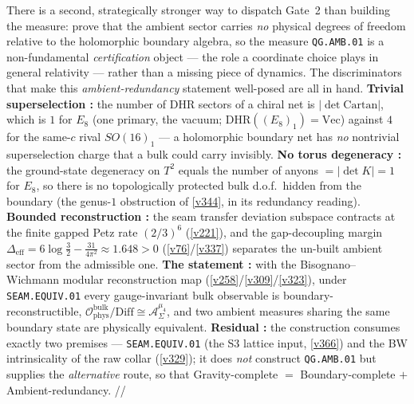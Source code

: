 \begin{keybox}
There is a second, strategically stronger way to dispatch Gate~2 than building the measure: prove that the
ambient sector carries \emph{no} physical degrees of freedom relative to the holomorphic boundary algebra, so the
measure \texttt{QG.AMB.01} is a non-fundamental \emph{certification} object --- the role a coordinate choice plays
in general relativity --- rather than a missing piece of dynamics. The discriminators that make this
\emph{ambient-redundancy} statement well-posed are all in hand. \textbf{Trivial superselection \mE:} the number
of DHR sectors of a chiral net is $|\det\mathrm{Cartan}|$, which is $1$ for $E_8$ (one primary, the vacuum;
$\mathrm{DHR}((E_8)_1)=\mathrm{Vec}$) against $4$ for the same-$c$ rival $SO(16)_1$ --- a holomorphic boundary net
has \emph{no} nontrivial superselection charge that a bulk could carry invisibly. \textbf{No torus degeneracy
\mE:} the ground-state degeneracy on $T^2$ equals the number of anyons $=|\det K|=1$ for $E_8$, so there is no
topologically protected bulk d.o.f.\ hidden from the boundary (the genus-$1$ obstruction of \vref{v344}, in its
redundancy reading). \textbf{Bounded reconstruction \mE:} the seam transfer deviation subspace contracts at the
finite gapped Petz rate $(2/3)^6$ (\vref{v221}), and the gap-decoupling margin
$\Delta_{\mathrm{eff}}=6\log\tfrac32-\tfrac{31}{4\pi^2}\approx1.648>0$ (\vref{v76}/\vref{v337}) separates the
un-built ambient sector from the admissible one. \textbf{The statement \mC:} with the Bisognano--Wichmann modular
reconstruction map (\vref{v258}/\vref{v309}/\vref{v323}), under \texttt{SEAM.EQUIV.01} every gauge-invariant bulk
observable is boundary-reconstructible,
$\mathcal O_{\mathrm{phys}}^{\mathrm{bulk}}/\mathrm{Diff}\cong\mathcal A_\Sigma^{\mu_4}$, and two ambient measures
sharing the same boundary state are physically equivalent. \textbf{Residual \mO:} the construction consumes
exactly two premises --- \texttt{SEAM.EQUIV.01} (the S3 lattice input, \vref{v366}) and the BW intrinsicality of
the raw collar (\vref{v329}); it does \emph{not} construct \texttt{QG.AMB.01} but supplies the \emph{alternative}
route, so that Gravity-complete $=$ Boundary-complete $+$ Ambient-redundancy. \mE/\mC/\mO
\end{keybox}

